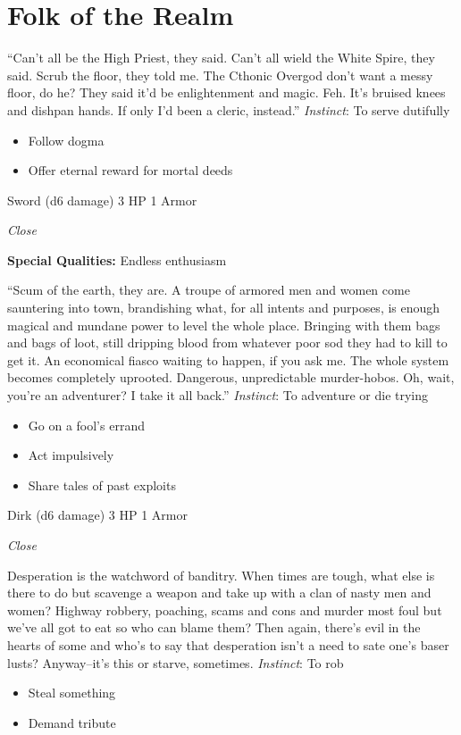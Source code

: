 \section{Folk of the Realm}

\HRule
{}

\HRule
``Can't all be the High Priest, they said. Can't all wield the White Spire, they said. Scrub the floor, they told me. The Cthonic Overgod don't want a messy floor, do he? They said it'd be enlightenment and magic. Feh. It's bruised knees and dishpan hands. If only I'd been a cleric, instead.'' \emph{Instinct}: To serve dutifully
\begin{itemize}
\item Follow dogma
\item Offer eternal reward for mortal deeds
\end{itemize}

\HRule
{}

Sword (d6 damage)\hspace*{\fill} 3 HP 1 Armor

\emph{Close}

\textbf{Special Qualities:}
Endless enthusiasm

\HRule
``Scum of the earth, they are. A troupe of armored men and women come sauntering into town, brandishing what, for all intents and purposes, is enough magical and mundane power to level the whole place. Bringing with them bags and bags of loot, still dripping blood from whatever poor sod they had to kill to get it. An economical fiasco waiting to happen, if you ask me. The whole system becomes completely uprooted. Dangerous, unpredictable murder-hobos. Oh, wait, you're an adventurer? I take it all back.'' \emph{Instinct}: To adventure or die trying
\begin{itemize}
\item Go on a fool's errand
\item Act impulsively
\item Share tales of past exploits
\end{itemize}
\newpage
\HRule
{}

Dirk (d6 damage)\hspace*{\fill} 3 HP 1 Armor

\emph{Close}

\HRule
Desperation is the watchword of banditry. When times are tough, what else is there to do but scavenge a weapon and take up with a clan of nasty men and women? Highway robbery, poaching, scams and cons and murder most foul but we've all got to eat so who can blame them? Then again, there's evil in the hearts of some and who's to say that desperation isn't a need to sate one's baser lusts? Anyway--it's this or starve, sometimes. \emph{Instinct}: To rob
\begin{itemize}
\item Steal something
\item Demand tribute
\end{itemize}

